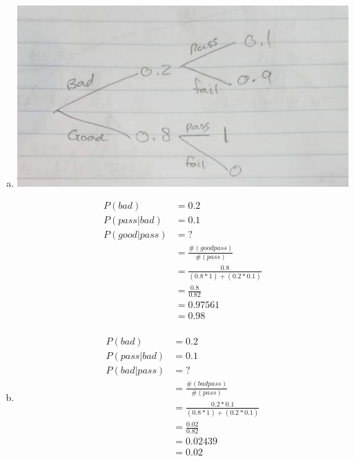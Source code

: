 \documentclass[10pt]{report}
\begin{document}
\subsection{}
 \begin{enumerate}[(a)]
        \item 
        \begin{center}
        \includegraphics[scale=0.5]{chipgraph}
        \end{center}
        \begin{align*}
        P(bad) &= 0.2 \\
        P(pass | bad) &= 0.1 \\
        P(good | pass) & = ? \\
        &= \frac{\#(good pass)}{\#(pass)} \\        
        &= \frac{0.8}{(0.8*1) + (0.2*0.1)} \\
        &= \frac{0.8}{0.82} \\
        &= 0.97561 \\
        &= \mathbf{0.98}\\
        \end{align*}
        \item \begin{align*}
         P(bad) &= 0.2 \\
        P(pass | bad) &= 0.1 \\
        P(bad | pass) & = ? \\
        &= \frac{\#(bad pass)}{\#(pass)} \\        
        &= \frac{0.2*0.1}{(0.8*1) + (0.2*0.1)} \\
        &= \frac{0.02}{0.82} \\
        &= 0.02439 \\
        &= \mathbf{0.02}\\
        \end{align*}
    \end{enumerate}
    \setcounter{subsection}{6}
\end{document}
